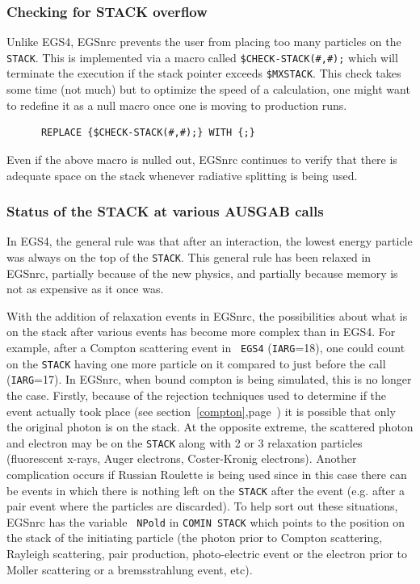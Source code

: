 \subsubsection{Checking for STACK overflow}
 
Unlike  EGS4, EGSnrc prevents the user from placing
too many particles on the {\tt STACK}. This is implemented via a macro
called {\tt \$CHECK-STACK(\#,\#);} which will terminate the execution if the
stack pointer exceeds {\tt \$MXSTACK}. This check takes some time (not much)
but to optimize the speed of a calculation, one might want to redefine it
as a null macro once one is moving to production runs.
\begin{verbatim}
      REPLACE {$CHECK-STACK(#,#);} WITH {;}
\end{verbatim}
Even if the above macro is nulled out, EGSnrc continues to verify that
there is adequate space on the stack whenever radiative splitting is being
used.

\subsubsection{Status of the STACK at various AUSGAB calls}
\label{stack_status}
In EGS4, the general rule was that after an interaction, the lowest energy
particle was always on the top of the {\tt STACK}. This general rule has
been relaxed in EGSnrc, partially because of the new physics, and partially
because memory is not as expensive as it once was.

With the addition of relaxation events in EGSnrc, the possibilities
about what is on the stack after various events has become more complex
than in EGS4. For example, after a Compton scattering event in {\tt
EGS4}
({\tt IARG}=18), one could count on the {\tt STACK} having one more particle on it
compared to just before the call ({\tt IARG}=17). In EGSnrc, when bound compton
is being simulated, this is no longer the case.  Firstly, because of the
rejection techniques used to determine if the event actually took place
(see section~\ref{compton},page~\pageref{compton}) it is possible that only the
original photon is on the stack. At the opposite extreme, the scattered
photon and electron may be on the {\tt STACK} along with 2 or 3 relaxation
particles (fluorescent x-rays, Auger electrons, Coster-Kronig electrons).
Another complication occurs if Russian Roulette is being used since in this
case there can be events in which there is nothing left on the {\tt STACK} after
the event (e.g. after a pair event where the particles are discarded).
To help sort out these situations, EGSnrc has the variable {\tt
NPold} in {\tt COMIN STACK} which points to the position on the stack of the initiating particle
(the photon prior to Compton scattering, Rayleigh scattering, pair
production, photo-electric event or the electron prior to Moller scattering
or a bremsstrahlung event, etc).

